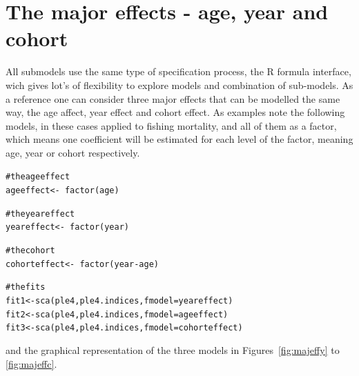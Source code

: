 \documentclass[a4paper,english,10pt]{article}\usepackage[]{graphicx}\usepackage[]{color}
\makeatletter
\newcommand{\hlcom}[1]{\textcolor[rgb]{0.588,0.588,0.588}{#1}}%
\newcommand{\hlopt}[1]{\textcolor[rgb]{0.196,0.196,0.196}{#1}}%
\newcommand{\hlstd}[1]{\textcolor[rgb]{0.196,0.196,0.196}{#1}}%
\newcommand{\hlkwb}[1]{\textcolor[rgb]{0.627,0,0.314}{#1}}%
\newcommand{\hlkwc}[1]{\textcolor[rgb]{0,0.631,0.314}{#1}}%
\newcommand{\hlkwd}[1]{\textcolor[rgb]{0.78,0.227,0.412}{#1}}%
\newenvironment{kframe}{%
 \def\at@end@of@kframe{}%
 \ifinner\ifhmode%
  \def\at@end@of@kframe{\end{minipage}}%
  \begin{minipage}{\columnwidth}%
 \fi\fi%
 \def\FrameCommand##1{\hskip\@totalleftmargin \hskip-\fboxsep
 \colorbox{shadecolor}{##1}\hskip-\fboxsep
     \hskip-\linewidth \hskip-\@totalleftmargin \hskip\columnwidth}%
 \MakeFramed {\advance\hsize-\width
   \@totalleftmargin\z@ \linewidth\hsize
   \@setminipage}}%
 {\par\unskip\endMakeFramed%
 \at@end@of@kframe}
\newenvironment{knitrout}{}{} %
\makeatother
\begin{document}
\section{The major effects - age, year and cohort}

All submodels use the same type of specification process, the R formula interface, wich gives lot's of flexibility to explore models and combination of sub-models. As a reference one can consider three major effects that can be modelled the same way, the age affect, year effect and cohort effect. As examples note the following models, in these cases applied to fishing mortality, and all of them as a factor, which means one coefficient will be estimated for each level of the factor, meaning age, year or cohort respectively.

\begin{knitrout}
\color{fgcolor}\begin{kframe}
\begin{alltt}
\hlcom{# the age effect}
\hlstd{ageeffect} \hlkwb{<-} \hlopt{~}\hlkwd{factor}\hlstd{(age)}

\hlcom{# the year effect}
\hlstd{yeareffect} \hlkwb{<-} \hlopt{~}\hlkwd{factor}\hlstd{(year)}

\hlcom{# the cohort}
\hlstd{cohorteffect} \hlkwb{<-} \hlopt{~}\hlkwd{factor}\hlstd{(year} \hlopt{-} \hlstd{age)}

\hlcom{# the fits}
\hlstd{fit1} \hlkwb{<-} \hlkwd{sca}\hlstd{(ple4, ple4.indices,} \hlkwc{fmodel} \hlstd{= yeareffect)}
\hlstd{fit2} \hlkwb{<-} \hlkwd{sca}\hlstd{(ple4, ple4.indices,} \hlkwc{fmodel} \hlstd{= ageeffect)}
\hlstd{fit3} \hlkwb{<-} \hlkwd{sca}\hlstd{(ple4, ple4.indices,} \hlkwc{fmodel} \hlstd{= cohorteffect)}
\end{alltt}
\end{kframe}
\end{knitrout}

and the graphical representation of the three models in Figures~\ref{fig:majeffy} to \ref{fig:majeffc}.
\end{document}
